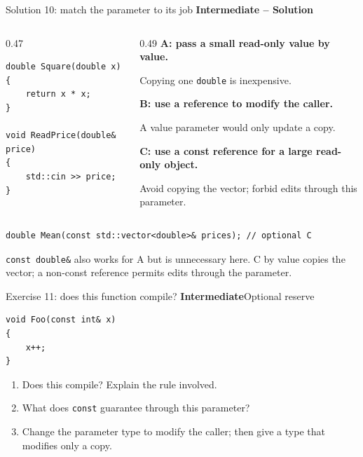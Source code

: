 \documentclass[10pt,aspectratio=169]{beamer}
\newcommand{\exerciseinfo}[2]{%
  \textbf{#1}\hfill{\small #2}\par
}
\newcommand{\solutioninfo}[1]{%
  {\color{MatrixGreen!75!black}\textbf{#1 -- Solution}}\par
}
\begin{document}
\begin{frame}[fragile]{Solution 10: match the parameter to its job}
\relax
\solutioninfo{Intermediate}
\begin{columns}[T,onlytextwidth]
\begin{column}{0.47\textwidth}
\begin{lstlisting}
double Square(double x)
{
    return x * x;
}

void ReadPrice(double& price)
{
    std::cin >> price;
}
\end{lstlisting}
\end{column}
\begin{column}{0.49\textwidth}
\textbf{A: pass a small read-only value by value.}\par
Copying one \texttt{double} is inexpensive.\par
\smallskip
\textbf{B: use a reference to modify the caller.}\par
A value parameter would only update a copy.\par
\smallskip
\textbf{C: use a const reference for a large read-only object.}\par
Avoid copying the vector; forbid edits through this parameter.
\end{column}
\end{columns}
\begin{lstlisting}
double Mean(const std::vector<double>& prices); // optional C
\end{lstlisting}
{\small \texttt{const double\&} also works for A but is unnecessary here.
C by value copies the vector; a non-const reference permits edits through the parameter.}
\end{frame}

\begin{frame}[fragile]{Exercise 11: does this function compile?}
\relax
\exerciseinfo{Intermediate}{Optional reserve}
\begin{center}
\begin{minipage}{0.78\textwidth}
\begin{lstlisting}
void Foo(const int& x)
{
    x++;
}
\end{lstlisting}
\end{minipage}
\end{center}
\begin{enumerate}
\item Does this compile? Explain the rule involved.
\item What does \texttt{const} guarantee through this parameter?
\item Change the parameter type to modify the caller; then give a type that modifies only a copy.
\end{enumerate}
\end{frame}
\end{document}
